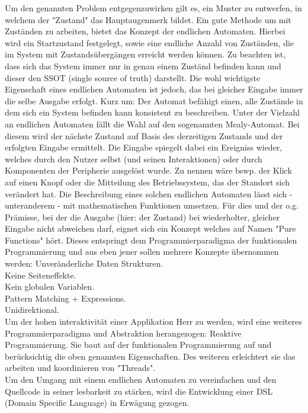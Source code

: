 Um den genannten Problem entgegenzuwirken gilt es, ein Muster zu entwerfen,
in welchem der "Zustand" das Hauptaugenmerk bildet.
Ein gute Methode um mit Zuständen zu arbeiten, bietet das Konzept der endlichen Automaten.
Hierbei wird ein Startzustand festgelegt, sowie eine endliche Anzahl von Zuständen, die im System mit
Zustandsübergängen erreicht werden können. Zu beachten ist, dass sich das System immer nur in genau
einem Zuständ befinden kann und dieser den SSOT (single source of truth) darstellt.
Die wohl wichtigste Eigenschaft eines endlichen Automaten ist jedoch, das bei gleicher Eingabe
immer die selbe Ausgabe erfolgt.
Kurz um: Der Automat befähigt einen, alle Zustände in dem sich ein System befinden kann
konsistent zu beschreiben. 
Unter der Vielzahl an endlichen Automaten fällt die Wahl auf den sogenannten Mealy-Automat.
Bei diesem wird der nächste Zustand auf Basis des derzeitigen Zustands und der erfolgten Eingabe ermittelt.
Die Eingabe spiegelt dabei ein Ereigniss wieder, welches durch den Nutzer selbst (und seinen Interaktionen) 
oder durch Komponenten der Peripherie ausgelöst wurde. Zu nennen wäre bswp. 
der Klick auf einen Knopf oder die Mitteilung des Betriebssystem, das der Standort sich verändert hat.
Die Beschreibung eines solchen endlichen Automaten lässt sich - unteranderem - mit
mathematischen Funktionen umsetzen. Für dies und der o.g. Prämisse, bei der die Ausgabe (hier: der Zustand) bei wiederholter,
gleicher Eingabe nicht abweichen darf, eignet sich ein Konzept welches auf Namen "Pure Functions" hört.
Dieses entspringt dem Programmierparadigma der funktionalen Programmierung und aus eben jener sollen mehrere Konzepte übernommen werden:
Unveränderliche Daten Strukturen. \\
Keine Seiteneffekte. \\
Kein globalen Variablen. \\
Pattern Matching + Expressions. \\
Unidirektional.\\
Um der hohen interaktivität einer Applikation Herr zu werden, wird eine weiteres Programmierparadigma und
Abstraktion herangezogen: Reaktive Programmierung.
Sie baut auf der funktionalen Programmierung auf und berücksichtig die oben genannten Eigenschaften.
Des weiteren erleichtert sie das arbeiten und koordinieren von "Threads". 
\\
Um den Umgang mit einem endlichen Automaten zu vereinfachen und den Quellcode in seiner lesbarkeit zu stärken,
wird die Entwicklung einer DSL (Domain Specific Language) in Erwägung gezogen.


